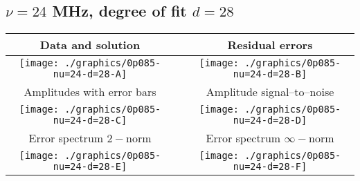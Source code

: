 

% 

\clearpage{}
\break{}

\subsection{$\nu = 24$ MHz, degree of fit $d = 28$}

\begin{table}[h]
    \begin{center}
        \begin{tabular}{ccc}
            Data and solution & \quad & Residual errors \\\hline
            \texttt{[image: ./graphics/0p085-nu=24-d=28-A]} &&
            \texttt{[image: ./graphics/0p085-nu=24-d=28-B]} \\[15pt]
            Amplitudes with error bars && Amplitude signal--to--noise \\\hline
            \texttt{[image: ./graphics/0p085-nu=24-d=28-C]} &&
            \texttt{[image: ./graphics/0p085-nu=24-d=28-D]} \\[15pt]
            Error spectrum $2-$norm && Error spectrum $\infty-$norm \\\hline
            \texttt{[image: ./graphics/0p085-nu=24-d=28-E]} &&
            \texttt{[image: ./graphics/0p085-nu=24-d=28-F]} \\[15pt]
        \end{tabular}
    \end{center}
\label{fig:elev=85, nu=24}
\end{table}



\endinput
